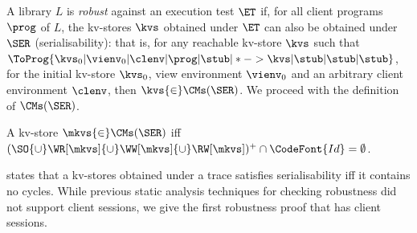 
A library $L$ is \emph{robust} against an execution test $\ET$
if, for all client programs \( \prog \) of $L$, 
the kv-stores \( \kvs \) obtained under $\ET$ can also be obtained under $\SER$ (serialisability):
that is, for any reachable kv-store \( \kvs \) such that
\( \ToProg{\kvs_0 | \vienv_0 | \clenv | \prog | \stub | * -> \kvs | \stub | \stub | \stub }\),
for the initial kv-store \( \kvs_0 \), view environment \( \vienv_0 \) and an arbitrary client environment \( \clenv \),
then \( \kvs {\in} \CMs(\SER) \).
We proceed with the definition of $\CMs(\SER)$. %

 \SpaceAboveDef
\begin{definition}
\label{thm:serialisable_nocycle}
A kv-store $\mkvs {\in} \CMs(\SER)$ iff $(\SO {\cup} \WR[\mkvs] 
{\cup} \WW[\mkvs] {\cup} \RW[\mkvs])^{+} \cap \CodeFont{Id} = \emptyset$.
\end{definition}
\SpaceBelowDef

 states that a kv-stores obtained under a trace satisfies serialisability iff it contains no cycles. %
While previous static analysis techniques for checking robustness \citep{giovanni_concur16,SIanalysis,laws,sureshConcur}
did not support client sessions, 
we give the first robustness proof that has client sessions.

